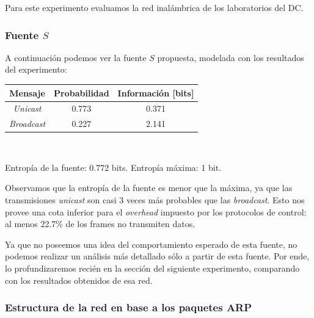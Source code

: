 \par Para este experimento evaluamos la red inalámbrica de los laboratorios del DC.

\subsubsection{Fuente $S$}

\par A continuación podemos ver la fuente $S$ propuesta, modelada con los resultados del experimento: \\

\begin{tabular}{ | c | c | c |}
    \hline
    Mensaje & Probabilidad & Información [bits] \\
    \hline
    \textit{Unicast} & 0.773 & 0.371 \\
    \hline
    \textit{Broadcast} & 0.227 & 2.141 \\
    \hline
\end{tabular} \\

\par Entropía de la fuente: 0.772 bits. Entropía máxima: 1 bit.

\par Observamos que la entropía de la fuente es menor que la máxima, ya que las transmisiones \textit{unicast} son casi 3 veces más probables que las \textit{broadcast}.
Esto nos provee una cota inferior para el \textit{overhead} impuesto por los protocolos de control: al menos 22.7\% de los frames no transmiten datos.

\par Ya que no poseemos una idea del comportamiento esperado de esta fuente, no podemos realizar un análisis más detallado sólo a partir de esta fuente.
Por ende, lo profundizaremos recién en la sección del siguiente experimento, comparando con los resultados obtenidos de esa red.


\subsubsection{Estructura de la red en base a los paquetes ARP}

